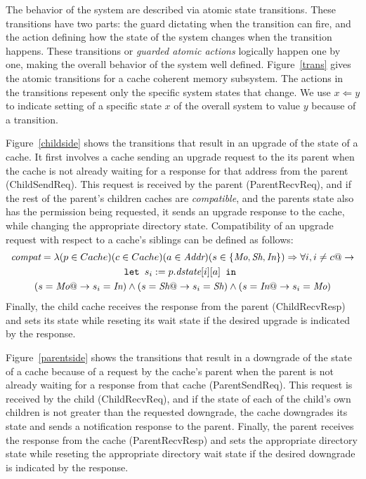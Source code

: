The behavior of the system are described via atomic state transitions.
These transitions have two parts: the guard dictating when the
transition can fire, and the action defining how the state of the
system changes when the transition happens. These transitions or \emph{guarded
atomic actions} logically happen one by one, making the overall behavior of the
system well defined. Figure~\ref{trans} gives the atomic transitions for a
cache coherent memory subsystem. The actions in the transitions repesent only
the specific system states that change. We use $x \Leftarrow y$ to indicate
setting of a specific state $x$ of the overall system to value $y$ because of a
transition.

Figure~\ref{childside} shows the transitions that result in an upgrade of the
state of a cache. It first involves a cache sending an upgrade request to the
its parent when the cache is not already waiting for a response for that
address from the parent (ChildSendReq). This request is received by the parent
(ParentRecvReq), and if the rest of the parent's children caches are
\emph{compatible}, and the parents state also has the permission being
requested, it sends an upgrade response to the cache, while changing the
appropriate directory state. Compatibility of an upgrade request with respect
to a cache's siblings can be defined as follows:
\begin{multline*}
\textit{compat} = \lambda (p \in Cache) (c \in Cache) (a \in \textit{Addr}) (s \in \{\textit{Mo}, \textit{Sh}, \textit{In}\}) \Rightarrow \forall i, i \ne c @-> \\
\texttt{let } s_i := p.\textit{dstate}[i][a] \texttt{ in }\\
 (s = \textit{Mo} @-> s_i = \textit{In}) \wedge (s = \textit{Sh} @-> s_i = \textit{Sh}) \wedge (s = \textit{In} @-> s_i = \textit{Mo})
\end{multline*}
Finally, the child cache receives the response from the parent (ChildRecvResp)
and sets its state while reseting its wait state if the desired upgrade is
indicated by the response.

Figure~\ref{parentside} shows the transitions that result in a downgrade of the
state of a cache because of a request by the cache's parent when the parent is
not already waiting for a response from that cache (ParentSendReq).  This
request is received by the child (ChildRecvReq), and if the state of each of
the child's own children is not greater than the requested downgrade, the cache
downgrades its state and sends a notification response to the parent. Finally,
the parent receives the response from the cache (ParentRecvResp) and sets the
appropriate directory state while reseting the appropriate directory wait state
if the desired downgrade is indicated by the response.

